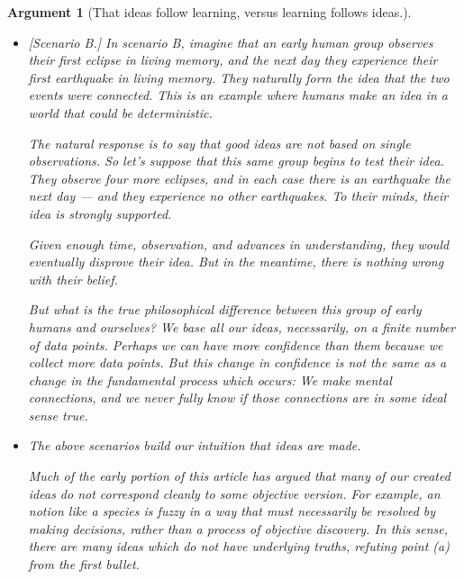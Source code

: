 \documentclass[11pt, oneside]{article}   	%
\newtheorem{argt}{Argument}
\begin{document}
\begin{argt}[That ideas follow learning, versus learning follows ideas.]
\begin{itemize}
        In this scenario, the creatures are clearly creating ideas not out of an
        underlying truth, but simply by pattern matching on limited data.

        This scenario shows that it's possible to make ideas even if there are
        no underlying ideas to discover.
        But this scenario
        may be quite different from reality, so it's useful to consider a case
        that feels closer to our world.

    \item{} [Scenario B.]
        In scenario B, imagine that an early human group observes their first
        eclipse in living memory, and the next day they experience their first
        earthquake in living memory. They naturally form the idea that the two
        events were connected. This is an example where humans make an idea in a
        world that could be deterministic.

        The natural response is to say that good ideas are not based on single
        observations.
        So let's suppose
        that this same group begins to test their idea. They
        observe four more eclipses, and in each case there is an earthquake the
        next day --- and they experience no other earthquakes. To their minds,
        their idea is strongly supported.

        Given enough time, observation, and advances in understanding, they
        would eventually disprove their idea. But in the meantime, there is
        nothing wrong with their belief.

        But what is the true philosophical difference between this group of
        early humans and ourselves? We base all our ideas, necessarily, on a
        finite number of data points. Perhaps we can have more confidence than
        them because we collect more data points. But this change in confidence
        is not the same as a change in the fundamental process which occurs: We
        make mental connections, and we never fully know if those connections
        are in some ideal sense true.

    \item{}
        The above scenarios build our intuition that ideas are {\em made}.

        Much of the early portion of this article has argued that many of our
        created ideas do not correspond cleanly to some objective version. For
        example, an notion like a species is fuzzy in a way that must
        necessarily be resolved by making decisions, rather than a process of
        objective discovery. In this sense, there are many ideas which do not
        have underlying truths, refuting point (a) from the first bullet.


\end{itemize}
\end{argt}
\end{document}
